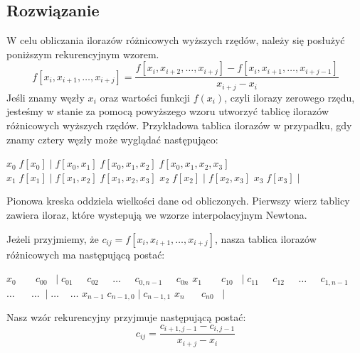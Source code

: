 \documentclass{article}
\begin{document}
\begin{center}
    \subsection{Rozwiązanie}
    \large W celu obliczania ilorazów różnicowych wyższych rzędów, należy się posłużyć poniższym rekurencyjnym wzorem.
    \[f[x_{i},x_{i+1},\dots,x_{i+j}]=\frac{f[x_{i},x_{i+2},\dots,x_{i+j}]-f[x_{i},x_{i+1},\dots,x_{i+j-1}]}{x_{i+j}-x_{i}}\] \newline
    Jeśli znamy węzły \(x_{i}\) oraz wartości funkcji \(f(x_{i})\), czyli ilorazy zerowego rzędu, jesteśmy w stanie za pomocą powyższego wzoru utworzyć
    tablicę ilorazów różnicowych wyższych rzędów. \newline Przykładowa tablica ilorazów w przypadku, gdy znamy cztery węzły może wyglądać następująco: \newline
    \begin{flushleft}
    \(x_{0}\;f[x_{0}]\;|\;f[x_{0},x_{1}]\;f[x_{0},x_{1},x_{2}]\;f[x_{0},x_{1},x_{2},x_{3}]\) \newline
    \(x_{1}\;f[x_{1}]\;|\;f[x_{1},x_{2}]\;f[x_{1},x_{2},x_{3}]\) \newline
    \(x_{2}\;f[x_{2}]\;|\;f[x_{2},x_{3}]\) \newline
    \(x_{3}\;f[x_{3}]\;|\)
    \end{flushleft}
    Pionowa kreska oddziela wielkości dane od obliczonych. \newline
    Pierwszy wierz tablicy zawiera iloraz, które wystepują we wzorze interpolacyjnym Newtona. \newline

    Jeżeli przyjmiemy, że \(c_{ij}=f[x_{i},x_{i+1},\dots,x_{i+j}]\), nasza tablica ilorazów różnicowych ma następującą postać: \newline
    \begin{flushleft}
        \(x_{0}\;\;\;\;\;\;\;c_{00}\;\;\;|\;c_{01}\;\;\;\;\;c_{02}\;\;\;\;\;\dots\;\;\;\;\;c_{0,n-1}\;\;\;\;\;c_{0n}\) \newline
        \(x_{1}\;\;\;\;\;\;\;c_{10}\;\;\;|\;c_{11}\;\;\;\;\;c_{12}\;\;\;\;\;\dots\;\;\;\;\;c_{1,n-1}\) \newline
        \(\dots\;\;\;\;\;\;\dots\;\;|\;\dots\;\;\;\;\dots\) \newline
        \(x_{n-1}\;c_{n-1,0}\;|\;c_{n-1,1}\) \newline
        \(x_{n}\;\;\;\;\;\;c_{n0}\;\;\;|\)
    \end{flushleft}

    Nasz wzór rekurencyjny przyjmuje następującą postać: \newline
    \[c_{ij}=\frac{c_{i+1,j-1}-c_{i,j-1}}{x_{i+j}-x_{i}}\]


\end{center}
\end{document}
